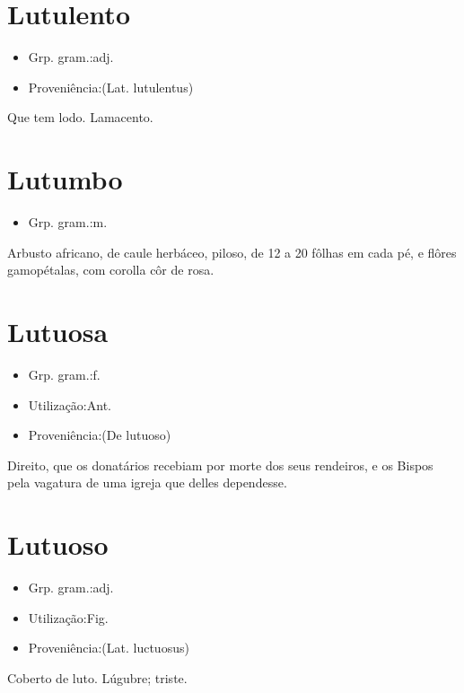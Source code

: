 \section{Lutulento}
\begin{itemize}
\item {Grp. gram.:adj.}
\end{itemize}
\begin{itemize}
\item {Proveniência:(Lat. \textunderscore lutulentus\textunderscore )}
\end{itemize}
Que tem lodo.
Lamacento.
\section{Lutumbo}
\begin{itemize}
\item {Grp. gram.:m.}
\end{itemize}
Arbusto africano, de caule herbáceo, piloso, de 12 a 20 fôlhas em cada pé, e flôres gamopétalas, com corolla côr de rosa.
\section{Lutuosa}
\begin{itemize}
\item {Grp. gram.:f.}
\end{itemize}
\begin{itemize}
\item {Utilização:Ant.}
\end{itemize}
\begin{itemize}
\item {Proveniência:(De \textunderscore lutuoso\textunderscore )}
\end{itemize}
Direito, que os donatários recebiam por morte dos seus rendeiros, e os Bispos pela vagatura de uma igreja que delles dependesse.
\section{Lutuoso}
\begin{itemize}
\item {Grp. gram.:adj.}
\end{itemize}
\begin{itemize}
\item {Utilização:Fig.}
\end{itemize}
\begin{itemize}
\item {Proveniência:(Lat. \textunderscore luctuosus\textunderscore )}
\end{itemize}
Coberto de luto.
Lúgubre; triste.
